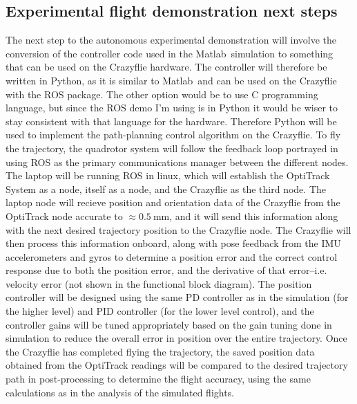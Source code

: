 \documentclass[onecolumn,10pt]{IEEEtran}
\newcommand{\MATLAB}{Matlab}
\begin{document}
\subsection{Experimental flight demonstration next steps}
The next step to the autonomous experimental demonstration will involve the conversion of the controller code used in the \MATLAB\ simulation to something that can be used on the Crazyflie hardware. The controller will therefore be written in Python, as it is similar to \MATLAB\ and can be used on the Crazyflie with the ROS package. The other option would be to use C programming language, but since the ROS demo I'm using is in Python it would be wiser to stay consistent with that language for the hardware. Therefore Python will be used to implement the path-planning control algorithm on the Crazyflie. To fly the trajectory, the quadrotor system will follow the feedback loop portrayed in  using ROS as the primary communications manager between the different nodes. The laptop will be running ROS in linux, which will establish the OptiTrack System as a node, itself as a node, and the Crazyflie as the third node. The laptop node will recieve position and orientation data of the Crazyflie from the OptiTrack node accurate to $\approx \SI{0.5}{\milli\meter}$, and it will send this information along with the next desired trajectory position to the Crazyflie node. The Crazyflie will then process this information onboard, along with pose feedback from the IMU accelerometers and gyros to determine a position error and the correct control response due to both the position error, and the derivative of that error--i.e. velocity error (not shown in the functional block diagram). The position controller will be designed using the same PD controller as in the simulation (for the higher level) and PID controller (for the lower level control), and the controller gains will be tuned appropriately based on the gain tuning done in simulation to reduce the overall error in position over the entire trajectory. Once the Crazyflie has completed flying the trajectory, the saved position data obtained from the OptiTrack readings will be compared to the desired trajectory path in post-processing to determine the flight accuracy, using the same calculations as in the analysis of the simulated flights.
\end{document}

